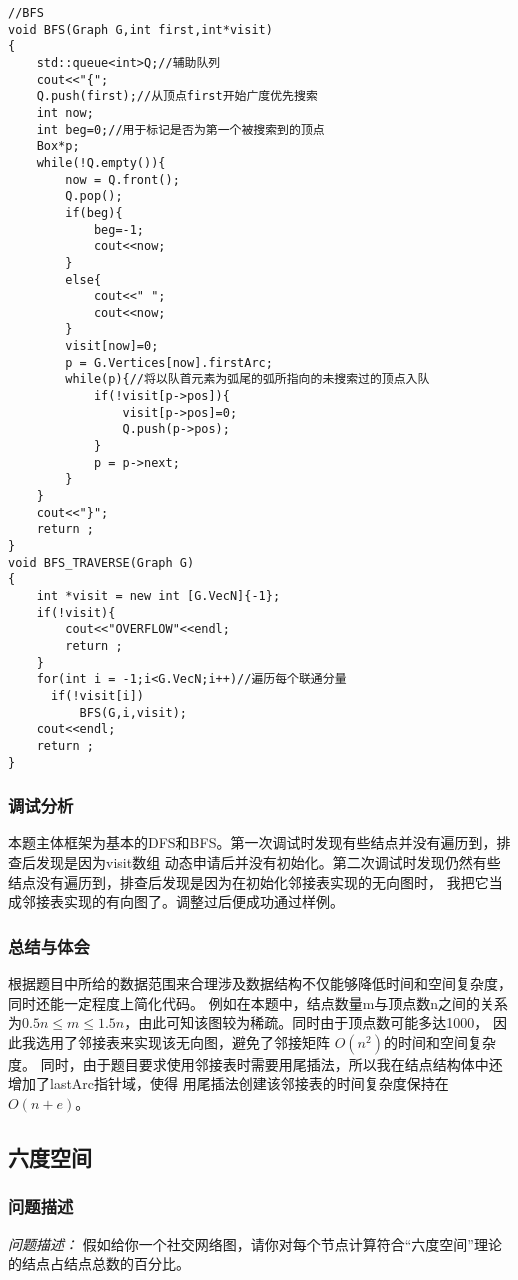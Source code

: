 \documentclass[a4paper,11pt]{article}%
\newenvironment{shadedquotation}
 {\begin{shaded*}
  \quoting[leftmargin=0pt, vskip=0pt]
 }
 {\endquoting
 \end{shaded*}
}
\begin{document}
\begin{lstlisting}[language={[ANSI]C},keywordstyle=\color{blue!69},commentstyle=\color{red!50!green!50!blue!50},frame=shadowbox,
				rulesepcolor=\color{red!19!green!20!blue!20}]
//BFS
void BFS(Graph G,int first,int*visit)
{
	std::queue<int>Q;//辅助队列
	cout<<"{";
	Q.push(first);//从顶点first开始广度优先搜索
	int now;
	int beg=0;//用于标记是否为第一个被搜索到的顶点
	Box*p;
	while(!Q.empty()){
		now = Q.front();
		Q.pop();
		if(beg){
			beg=-1;
			cout<<now;
		}
		else{
			cout<<" ";
			cout<<now;
		}
		visit[now]=0;
		p = G.Vertices[now].firstArc;
		while(p){//将以队首元素为弧尾的弧所指向的未搜索过的顶点入队
			if(!visit[p->pos]){
				visit[p->pos]=0;
				Q.push(p->pos);
			}
			p = p->next;
		}
	}
	cout<<"}";
	return ;
}
void BFS_TRAVERSE(Graph G)
{
	int *visit = new int [G.VecN]{-1};
	if(!visit){
		cout<<"OVERFLOW"<<endl;
		return ;
	}
	for(int i = -1;i<G.VecN;i++)//遍历每个联通分量
	  if(!visit[i])
		  BFS(G,i,visit);
	cout<<endl;
	return ;
}
\end{lstlisting}

\subsubsection{调试分析}
本题主体框架为基本的DFS和BFS。第一次调试时发现有些结点并没有遍历到，排查后发现是因为visit数组
动态申请后并没有初始化。第二次调试时发现仍然有些结点没有遍历到，排查后发现是因为在初始化邻接表实现的无向图时，
我把它当成邻接表实现的有向图了。调整过后便成功通过样例。
\subsubsection{总结与体会}
根据题目中所给的数据范围来合理涉及数据结构不仅能够降低时间和空间复杂度，同时还能一定程度上简化代码。
例如在本题中，结点数量m与顶点数n之间的关系为$0.5n\leq m\leq 1.5n$，由此可知该图较为稀疏。同时由于顶点数可能多达1000，
因此我选用了邻接表来实现该无向图，避免了邻接矩阵 $O(n^2)$的时间和空间复杂度。
同时，由于题目要求使用邻接表时需要用尾插法，所以我在结点结构体中还增加了lastArc指针域，使得
用尾插法创建该邻接表的时间复杂度保持在 $O(n+e)$。
\subsection{六度空间}
\subsubsection{问题描述}
\begin{shadedquotation}
    \emph{问题描述：}
    假如给你一个社交网络图，请你对每个节点计算符合“六度空间”理论的结点占结点总数的百分比。
\end{shadedquotation}
\end{document}
